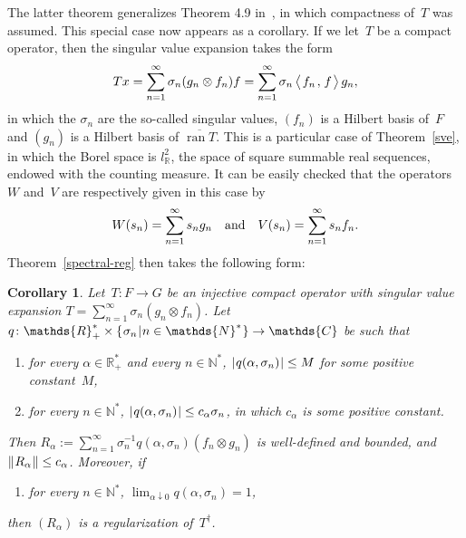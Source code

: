 \documentclass[a4paper]{article}
\newtheorem{corollary}{Corollary}
\def\Ce{\mathds{C}}
\def\Ne{\mathds{N}}
\def\Re{\mathds{R}}
\def\ran#1{\mathop{\mathrm{ran}}#1}
\def\vphan{\vphantom{\bigl|}}
\def\scalc#1#2{
    \left\langle\vphan
    \mskip 2mu #1 \mskip 2mu,
    \mskip 2mu #2 \mskip 2mu
    \right\rangle
    }
\def\set#1#2{\{\mskip 1mu #1 \mskip 1mu
    | \mskip 1mu #2 \mskip 1mu \}
    }
\def\mod#1{|\mskip 1mu #1 \mskip 1mu|}
\def\norm#1{\| \mskip 1mu #1 \mskip 1mu \|}
\begin{document}
The latter theorem generalizes Theorem 4.9 in~\cite{colton2013inverse},
in which compactness of~$T$ was assumed. This special case now appears
as a corollary. If we let~$T$ be a compact operator, then
the singular value expansion takes the form
$$
Tx=
\sum_{n=1}^\infty\sigma_n(g_n\otimes f_n)f=
\sum_{n=1}^\infty\sigma_n\scalc{f_n}{f}g_n,
$$
in which the $\sigma_n$ are the so-called singular values, $(f_n)$
is a Hilbert basis of~$F$ and $(g_n)$ is a Hilbert basis of $\overline{\ran{T}}$.
This is a particular case of Theorem~\ref{sve}, in which
the Borel space is $l^2_\Re$, the space of square summable real sequences, endowed with
the counting measure. It can be easily checked that the operators~$W$ and~$V$
are respectively given in this case by
$$
W(s_n)=\sum_{n=1}^\infty s_n g_n
\quad\hbox{and}\quad
V(s_n)=\sum_{n=1}^\infty s_n f_n.
$$
Theorem~\ref{spectral-reg} then takes the following form:

\begin{corollary}\sf
\label{spectral-reg-compact}
Let~$T\colon F\to G$ be an injective compact operator with
singular value expansion $T=\sum_{n=1}^\infty\sigma_n(g_n\otimes f_n)$.
Let $q\colon\Re_+^*\times\set{\sigma_n}{n\in\Ne^*}\to\Ce$ be such that
\begin{enumerate}
\item[(A1)]
for every $\alpha\in\Re_+^*$ and every $n\in\Ne^*$, 
$\mod{q(\alpha,\sigma_n)}\leq M$ for some positive constant~$M$,
\item[(A2)]
for every $n\in\Ne^*$, $\mod{q(\alpha,\sigma_n)}\leq c_\alpha\sigma_n$,
in which $c_\alpha$ is some positive constant.
\end{enumerate}
Then $R_\alpha:=\sum_{n=1}^\infty\sigma_n^{-1}q(\alpha,\sigma_n)(f_n\otimes g_n)$
is well-defined and bounded,
and $\norm{R_\alpha}\leq c_\alpha$.
Moreover, if
\begin{enumerate}
\item[(A3)]
for every $n\in\Ne^*$,
$\lim_{\alpha\downarrow 0}q(\alpha,\sigma_n)=1$,
\end{enumerate}
then $(R_\alpha)$ is a regularization of~$T^\dagger$.
\end{corollary}
\end{document}
